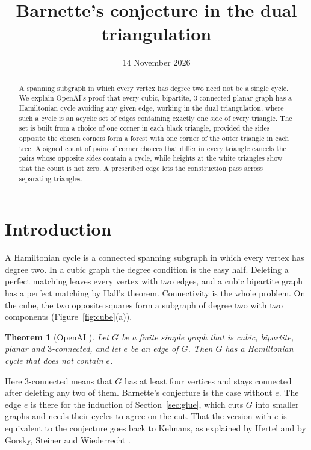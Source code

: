\documentclass[10pt]{amsart}
\title[Barnette's conjecture]{Barnette's conjecture in the dual triangulation}
\date{14 November 2026}
\numberwithin{equation}{section}
\newtheorem{theorem}[equation]{Theorem}
\theoremstyle{definition}
\theoremstyle{remark}
\begin{document}
\begin{abstract}
A spanning subgraph in which every vertex has degree two need not be a single cycle.
We explain OpenAI's proof that every cubic, bipartite, 3-connected planar graph has a Hamiltonian cycle avoiding any given edge, working in the dual triangulation, where such a cycle is an acyclic set of edges containing exactly one side of every triangle.
The set is built from a choice of one corner in each black triangle, provided the sides opposite the chosen corners form a forest with one corner of the outer triangle in each tree.
A signed count of pairs of corner choices that differ in every triangle cancels the pairs whose opposite sides contain a cycle, while heights at the white triangles show that the count is not zero.
A prescribed edge lets the construction pass across separating triangles.
\end{abstract}
\maketitle

\section{Introduction}

A Hamiltonian cycle is a connected spanning subgraph in which every vertex has degree two.
In a cubic graph the degree condition is the easy half.
Deleting a perfect matching leaves every vertex with two edges, and a cubic bipartite graph has a perfect matching by Hall's theorem.
Connectivity is the whole problem.
On the cube, the two opposite squares form a subgraph of degree two with two components (Figure~\ref{fig:cube}(a)).

\begin{theorem}[OpenAI {\cite[Theorem~1.1 and Corollary~7.1]{openai2026}}]\label{thm:main}
Let $G$ be a finite simple graph that is cubic, bipartite, planar and $3$-connected, and let $e$ be an edge of $G$.
Then $G$ has a Hamiltonian cycle that does not contain $e$.
\end{theorem}

Here $3$-connected means that $G$ has at least four vertices and stays connected after deleting any two of them.
Barnette's conjecture is the case without $e$.
The edge $e$ is there for the induction of Section~\ref{sec:glue}, which cuts $G$ into smaller graphs and needs their cycles to agree on the cut.
That the version with $e$ is equivalent to the conjecture goes back to Kelmans, as explained by Hertel \cite[Corollary~3]{hertel2005} and by Gorsky, Steiner and Wiederrecht \cite[Theorem~4.3]{gsw2023}.
\end{document}

